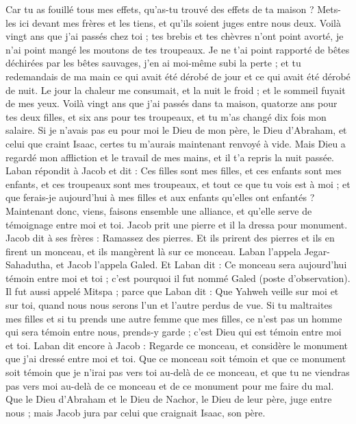 \begin{multicols}{2}
Car tu as fouillé tous mes effets, qu'as-tu trouvé des effets de ta maison ? Mets-les ici devant mes frères et les tiens, et qu'ils soient juges entre nous deux.
Voilà vingt ans que j'ai passés chez toi ; tes brebis et tes chèvres n'ont point avorté, je n'ai point mangé les moutons de tes troupeaux.
Je ne t'ai point rapporté de bêtes déchirées par les bêtes sauvages, j'en ai moi-même subi la perte ; et tu redemandais de ma main ce qui avait été dérobé de jour et ce qui avait été dérobé de nuit.
Le jour la chaleur me consumait, et la nuit le froid ; et le sommeil fuyait de mes yeux.
Voilà vingt ans que j'ai passés dans ta maison, quatorze ans pour tes deux filles, et six ans pour tes troupeaux, et tu m'as changé dix fois mon salaire.
Si je n'avais pas eu pour moi le Dieu de mon père, le Dieu d'Abraham, et celui que craint Isaac, certes tu m'aurais maintenant renvoyé à vide. Mais Dieu a regardé mon affliction et le travail de mes mains, et il t'a repris la nuit passée.
Laban répondit à Jacob et dit : Ces filles sont mes filles, et ces enfants sont mes enfants, et ces troupeaux sont mes troupeaux, et tout ce que tu vois est à moi ; et que ferais-je aujourd'hui à mes filles et aux enfants qu'elles ont enfantés ?
Maintenant donc, viens, faisons ensemble une alliance, et qu'elle serve de témoignage entre moi et toi.
Jacob prit une pierre et il la dressa pour monument.
Jacob dit à ses frères : Ramassez des pierres. Et ils prirent des pierres et ils en firent un monceau, et ils mangèrent là sur ce monceau.
Laban l'appela Jegar-Sahadutha, et Jacob l'appela Galed.
Et Laban dit : Ce monceau sera aujourd'hui témoin entre moi et toi ; c'est pourquoi il fut nommé Galed (poste d'observation).
Il fut aussi appelé Mitspa ; parce que Laban dit : Que Yahweh veille sur moi et sur toi, quand nous nous serons l'un et l'autre perdus de vue.
Si tu maltraites mes filles et si tu prends une autre femme que mes filles, ce n'est pas un homme qui sera témoin entre nous, prends-y garde ; c'est Dieu qui est témoin entre moi et toi.
Laban dit encore à Jacob : Regarde ce monceau, et considère le monument que j'ai dressé entre moi et toi.
Que ce monceau soit témoin et que ce monument soit témoin que je n'irai pas vers toi au-delà de ce monceau, et que tu ne viendras pas vers moi au-delà de ce monceau et de ce monument pour me faire du mal.
Que le Dieu d'Abraham et le Dieu de Nachor, le Dieu de leur père, juge entre nous ; mais Jacob jura par celui que craignait Isaac, son père.

\end{multicols}
